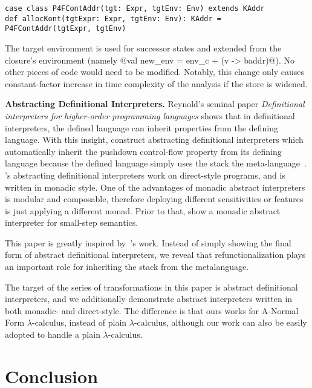 \documentclass[acmsmall,review,anonymous]{acmart}\settopmatter{printfolios=true,printccs=false,printacmref=false}
\begin{document}
\begin{lstlisting}
case class P4FContAddr(tgt: Expr, tgtEnv: Env) extends KAddr
def allocKont(tgtExpr: Expr, tgtEnv: Env): KAddr = P4FContAddr(tgtExpr, tgtEnv)
\end{lstlisting}

The target environment is used for successor states and extended from the closure's
environment (namely @val new_env = env_c + (v -> baddr)@).
No other pieces of code would need to be modified.
Notably, this change only causes constant-factor increase in time complexity of
the analysis if the store is widened.

\textbf{Abstracting Definitional Interpreters.}
Reynold's seminal paper \emph{Definitional interpreters for higher-order
  programming languages} \cite{reynolds1972definitional} shows that in
definitional interpreters, the defined language can inherit properties from the defining language.
With this insight, \citeauthor{darais2017abstracting} construct abstracting
definitional interpreters which automatically inherit the pushdown control-flow
property from its defining language
because the defined language simply uses the stack the
meta-language~\cite{darais2017abstracting}. \citeauthor{darais2017abstracting}'s abstracting
definitional interpreters work on direct-style programs, and is written in monadic style. One
of the advantages of monadic abstract interpreters is modular and composable, therefore
deploying different sensitivities or features is just applying a different monad.
Prior to that, \citeauthor{Sergey:2013:MAI:2491956.2491979} show a monadic
abstract interpreter for small-step semantics.

This paper is greatly inspired by~\citeauthor{darais2017abstracting}'s work.
Instead of simply showing the final form of abstract definitional interpreters,
we reveal that refunctionalization plays an important role for inheriting the
stack from the metalanguage.

The target of the series of transformations in this paper is abstract definitional
interpreters, and we additionally demonstrate abstract interpreters written in both
monadic- and direct-style.
The difference is that ours works for A-Normal Form $\lambda$-calculus, instead of plain
$\lambda$-calculus, although our work can also be easily adopted to handle a plain
$\lambda$-calculus.

\section{Conclusion}\label{sec:conclusion}
\end{document}
